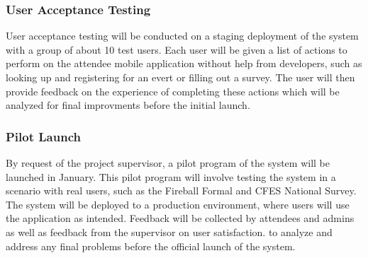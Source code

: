 \documentclass[12pt, titlepage]{article}
\begin{document}
  \subsubsection{User Acceptance Testing}
  User acceptance testing will be conducted on a staging deployment of the system with a group of about 10 test users. Each user will be given a list of actions to perform on the attendee mobile application without help from developers, such as looking up and registering for an evert or filling out a survey. The user will then provide feedback on the experience of completing these actions which will be analyzed for final improvments before the initial launch.

\subsubsection{Pilot Launch}
  By request of the project supervisor, a pilot program of the system will be launched in January. This pilot program will involve testing the system in a scenario with real users, such as the Fireball Formal and CFES National Survey. The system will be deployed to a production environment, where users will use the application as intended. Feedback will be collected by attendees and admins as well as feedback from the supervisor on user satisfaction. to analyze and address any final problems before the official launch of the system.
\end{document}
